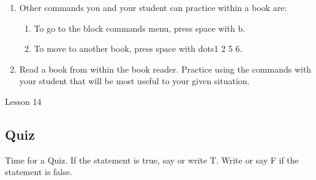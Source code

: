 \documentclass[10pt,letterpaper,twoside]{report}
\begin{document}
{{{{\begin{enumerate}
	      \begin{enumerate}
		      \item Use the back thumb-key to move back by one Braille display width.  Use the advance thumb-key to move forward by one Braille display width.
		            
		      \item To start the display moving automatically, press space with dots1 2 4 5 6.  Press the previous thumb-key to slow down the speed of automatic reading.  The next thumb-key will increase the rate of automatic reading.
		            
		      \item To stop automatic reading, pres the previous and next thumb-keys at the same time.
		            
		      \item For more thumb-key commands, visit the help menu from within a book.
		            
		            
	      \end{enumerate}
	\item Other commands you and your student can practice within a book are:
	      
	      \begin{enumerate}
		      \item To go to the block commands menu, press space with b.
		            
		      \item To move to another book, press space with dots1 2 5 6.
		            
		            
	      \end{enumerate}
	\item Read a book from within the book reader.  Practice using the commands with your student that will be most useful to your given situation.
\end{enumerate}





\clearpage

\newpage
Lesson 14

\subsection{Quiz}



Time for a Quiz.  If the statement is true, say or write T.  Write or say F if the statement is false.



}}}}
\end{document}
